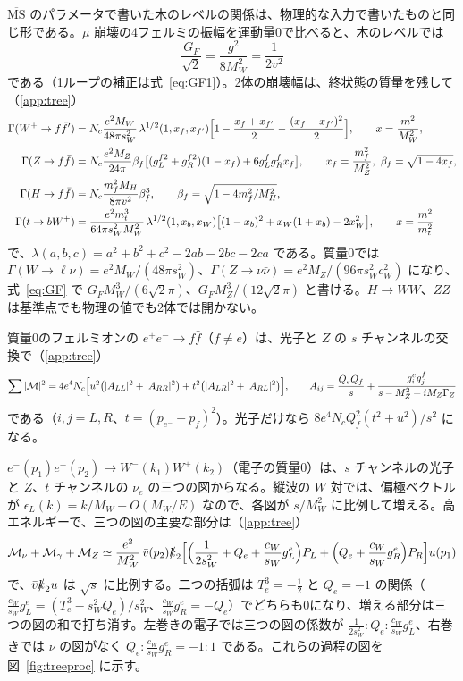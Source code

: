 \documentclass[a4paper,10pt]{ltjsarticle}
\newcommand{\MSbar}{\overline{\mathrm{MS}}}
\newcommand{\sw}{s_W}
\newcommand{\cw}{c_W}
\begin{document}
$\MSbar$ のパラメータで書いた木のレベルの関係は、物理的な入力で書いたものと同じ形である。$\mu$ 崩壊の4フェルミの振幅を運動量0で比べると、木のレベルでは
\begin{equation}
\frac{G_F}{\sqrt2}=\frac{g^2}{8M_W^2}=\frac1{2v^2}
\label{eq:GF}
\end{equation}
である（1ループの補正は式~\eqref{eq:GF1}）。2体の崩壊幅は、終状態の質量を残して（\ref{app:tree}）
\begin{equation}
\begin{aligned}
\Gamma(W^+\to f\bar f')&=N_c\frac{e^2M_W}{48\pi\sw^2}\,\lambda^{1/2}(1,x_f,x_{f'})\Bigl[1-\frac{x_f+x_{f'}}2-\frac{(x_f-x_{f'})^2}2\Bigr],\qquad x=\frac{m^2}{M_W^2},\\
\Gamma(Z\to f\bar f)&=N_c\frac{e^2M_Z}{24\pi}\beta_f\bigl[(g_L^{f2}+g_R^{f2})(1-x_f)+6g_L^fg_R^fx_f\bigr],\qquad x_f=\frac{m_f^2}{M_Z^2},\ \beta_f=\sqrt{1-4x_f},\\
\Gamma(H\to f\bar f)&=N_c\frac{m_f^2M_H}{8\pi v^2}\beta_f^3,\qquad \beta_f=\sqrt{1-4m_f^2/M_H^2},\\
\Gamma(t\to bW^+)&=\frac{e^2m_t^3}{64\pi\sw^2M_W^2}\,\lambda^{1/2}(1,x_b,x_W)\bigl[(1-x_b)^2+x_W(1+x_b)-2x_W^2\bigr],\qquad x=\frac{m^2}{m_t^2}
\end{aligned}
\label{eq:widths}
\end{equation}
で、$\lambda(a,b,c)=a^2+b^2+c^2-2ab-2bc-2ca$ である。質量0では $\Gamma(W\to\ell\nu)=e^2M_W/(48\pi\sw^2)$、$\Gamma(Z\to\nu\bar\nu)=e^2M_Z/(96\pi\sw^2\cw^2)$ になり、式~\eqref{eq:GF} で $G_FM_W^3/(6\sqrt2\pi)$、$G_FM_Z^3/(12\sqrt2\pi)$ と書ける。$H\to WW$、$ZZ$ は基準点でも物理の値でも2体では開かない。

質量0のフェルミオンの $e^+e^-\to f\bar f$（$f\ne e$）は、光子と $Z$ の $s$ チャンネルの交換で（\ref{app:tree}）
\begin{equation}
\sum|\mathcal M|^2=4e^4N_c\Bigl[u^2\bigl(|A_{LL}|^2+|A_{RR}|^2\bigr)+t^2\bigl(|A_{LR}|^2+|A_{RL}|^2\bigr)\Bigr],\qquad
A_{ij}=\frac{Q_eQ_f}{s}+\frac{g_i^eg_j^f}{s-M_Z^2+iM_Z\Gamma_Z}
\label{eq:eeff}
\end{equation}
である（$i,j=L,R$、$t=(p_{e^-}-p_f)^2$）。光子だけなら $8e^4N_cQ_f^2(t^2+u^2)/s^2$ になる。

$e^-(p_1)e^+(p_2)\to W^-(k_1)W^+(k_2)$（電子の質量0）は、$s$ チャンネルの光子と $Z$、$t$ チャンネルの $\nu_e$ の三つの図からなる。縦波の $W$ 対では、偏極ベクトルが $\epsilon_L(k)=k/M_W+O(M_W/E)$ なので、各図が $s/M_W^2$ に比例して増える。高エネルギーで、三つの図の主要な部分は（\ref{app:tree}）
\begin{equation}
\mathcal M_\nu+\mathcal M_\gamma+\mathcal M_Z\simeq\frac{e^2}{M_W^2}\,\bar v(p_2)\slashed k_2\Bigl[\Bigl(\frac1{2\sw^2}+Q_e+\frac{\cw}{\sw}g_L^e\Bigr)P_L+\Bigl(Q_e+\frac{\cw}{\sw}g_R^e\Bigr)P_R\Bigr]u(p_1)
\label{eq:eeww}
\end{equation}
で、$\bar v\slashed k_2u$ は $\sqrt s$ に比例する。二つの括弧は $T^3_e=-\frac12$ と $Q_e=-1$ の関係（$\frac{\cw}{\sw}g_L^e=(T^3_e-\sw^2Q_e)/\sw^2$、$\frac{\cw}{\sw}g_R^e=-Q_e$）でどちらも0になり、増える部分は三つの図の和で打ち消す。左巻きの電子では三つの図の係数が $\frac1{2\sw^2}:Q_e:\frac{\cw}{\sw}g_L^e$、右巻きでは $\nu$ の図がなく $Q_e:\frac{\cw}{\sw}g_R^e=-1:1$ である。これらの過程の図を図~\ref{fig:treeproc} に示す。
\end{document}
